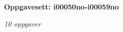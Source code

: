 \centerline{\bf Oppgavesett: i00050no-i00059no}
\vskip 10pt
\centerline{\it 10 oppgaver}\vskip 10pt
\vskip 10pt
